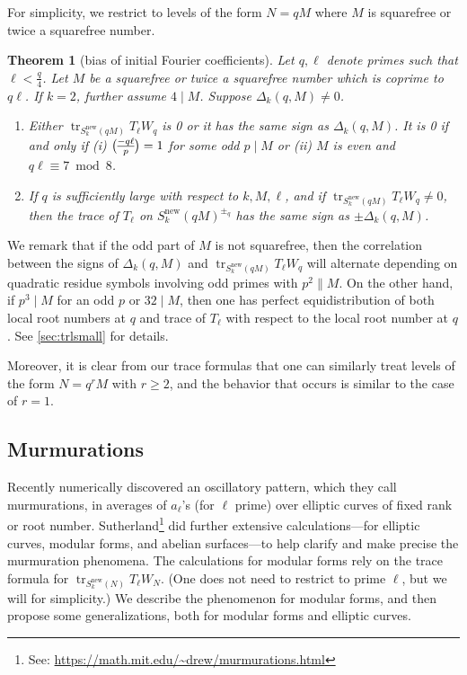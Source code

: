 \documentclass[11pt]{amsart}
\newcommand{\new}{\mathrm{new}}
\renewcommand{\mod}{\bmod}
\newcommand{\leg}{\overwithdelims ()}
\DeclareMathOperator{\tr}{tr}
\numberwithin{lem}{section}
\newtheorem{thm}[lem]{Theorem}
\theoremstyle{remark}
\theoremstyle{definition}
\numberwithin{equation}{section}
\begin{document}
For simplicity, we restrict to levels of the form $N= qM$ where $M$ is squarefree or twice a squarefree number.   

\begin{thm} [bias of initial Fourier coefficients] \label{thm16}
Let $q, \ell$ denote primes such that $\ell < \frac q4$.  Let $M$ be a squarefree or twice a squarefree number which is coprime to $q\ell$.  If $k=2$, further assume $4 \mid M$.
Suppose  $\Delta_k(q,M) \ne 0$.   
\begin{enumerate}
\item Either $\tr_{S_k^\new(q M)} T_\ell W_q$ is 0 or it has the same sign as $\Delta_k(q,M)$.  It is 0 if and only if (i) ${-q \ell \leg p} = 1$ for some odd $p \mid M$ or (ii) $M$ is even and $q\ell \equiv 7 \mod 8$.

\item
If $q$ is sufficiently large with respect to $k, M, \ell$, and if $\tr_{S_k^\new(q M)} T_\ell W_q \ne 0$, then the trace of $T_\ell$ on $S_k^\new(q M)^{\pm_q}$ has the same sign as $\pm \Delta_k(q,M)$.
\end{enumerate}
\end{thm}

We remark that if the odd part of $M$ is not squarefree, then the correlation between the signs of $\Delta_k(q,M)$ and $\tr_{S_k^\new(q M)} T_\ell W_q$ will alternate depending on quadratic residue symbols involving odd primes with $p^2 \parallel M$.  
 On the other hand, if $p^3 \mid M$ for an odd $p$ or $32 \mid M$, then one has perfect equidistribution of both local root numbers at $q$ and trace of $T_\ell$ with respect to the local root number at $q$.  See \cref{sec:trlsmall} for details.

Moreover, it is clear from our trace formulas that one can similarly treat levels of the form $N =q^r M$ with $r \ge 2$, and the behavior that occurs is similar to the case of $r=1$.

\subsection{Murmurations} \label{sec:intro-murm}
Recently \cite{HLOP} numerically discovered an oscillatory pattern, which they call murmurations, in averages of $a_\ell$'s (for $\ell$ prime) over elliptic curves of fixed rank or root number.  Sutherland\footnote{See: \url{https://math.mit.edu/~drew/murmurations.html}} did further extensive calculations---for elliptic curves, modular forms, and abelian surfaces---to help clarify and make precise the murmuration phenomena.
The calculations for modular forms rely on the trace formula for $\tr_{S_k^\new(N)} T_\ell W_N$.  (One does not need to restrict to prime $\ell$, but we will for simplicity.)
We describe the phenomenon for modular forms, and then propose some generalizations, both for modular forms and elliptic curves.
\end{document}
